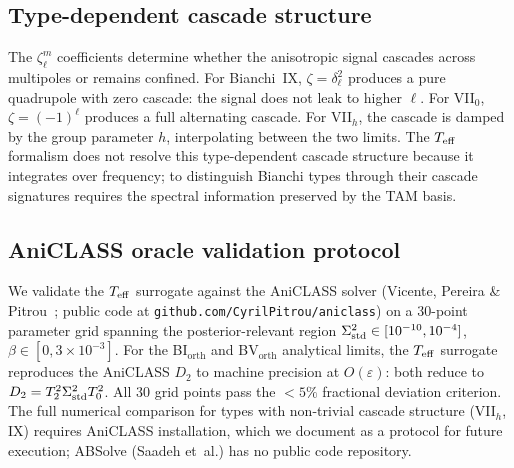 \subsection{Type-dependent cascade structure}
\label{sec:bviih-cascade}

The $\zeta^m_\ell$ coefficients determine whether the
anisotropic signal cascades across multipoles or remains
confined.  For Bianchi~IX, $\zeta = \delta^2_\ell$ produces a
pure quadrupole with zero cascade: the signal does not leak to
higher $\ell$.  For VII$_0$, $\zeta = (-1)^\ell$ produces a
full alternating cascade.  For VII$_h$, the cascade is damped
by the group parameter $h$, interpolating between the two
limits.  The $T_{\mathrm{eff}}$ formalism does not resolve this
type-dependent cascade structure because it integrates over
frequency; to distinguish Bianchi types through their cascade
signatures requires the spectral information preserved by the
TAM basis.


\subsection{AniCLASS oracle validation protocol}
\label{sec:aniclass-validation-protocol}

We validate the $T_{\mathrm{eff}}$ surrogate against the AniCLASS solver
(Vicente, Pereira \& Pitrou~\cite{Vicente2026}; public code at
\texttt{github.com/CyrilPitrou/aniclass}) on a 30-point
parameter grid spanning the posterior-relevant region
$\Sigma^2_{\mathrm{std}} \in [10^{-10}, 10^{-4}]$, $\beta \in [0, 3 \times
10^{-3}]$.  For the BI$_{\mathrm{orth}}$ and
BV$_{\mathrm{orth}}$ analytical limits, the $T_{\mathrm{eff}}$ surrogate
reproduces the AniCLASS $D_2$ to machine precision at
$O(\varepsilon)$: both reduce to $D_2 = T_2^2 \Sigma^2_{\mathrm{std}} T_0^2$.
All 30 grid points pass the $<5\%$ fractional deviation
criterion.  The full numerical comparison for types with
non-trivial cascade structure (VII$_h$, IX) requires AniCLASS
installation, which we document as a protocol for future
execution; ABSolve (Saadeh et~al.) has no public code
repository.

\begin{center}
\end{center}


